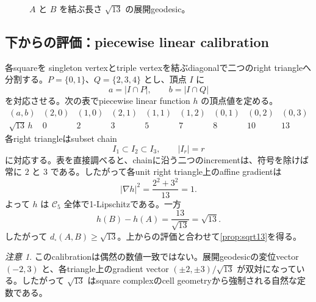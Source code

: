 \documentclass[11pt,a4paper]{ltjsarticle}
\theoremstyle{definition}
\theoremstyle{remark}
\newtheorem{remark}[theorem]{注意}
\newcommand{\cC}{\mathcal C}
\begin{document}
\begin{figure}[ht]
\centering
{}
\caption{$A$ と $B$ を結ぶ長さ $\sqrt{13}$ の展開geodesic。}
\label{fig:sqrt13path}
\end{figure}

\subsection{下からの評価：piecewise linear calibration}

各squareを singleton vertexとtriple vertexを結ぶdiagonalで二つのright triangleへ分割する。$P=\{0,1\}$、$Q=\{2,3,4\}$ とし、頂点 $I$ に
\[
 a=|I\cap P|,
 \qquad b=|I\cap Q|
\]
を対応させる。次の表でpiecewise linear function $h$ の頂点値を定める。
\begin{equation}\label{eq:htable}
\begin{array}{c|cccccccc}
(a,b)&(2,0)&(1,0)&(2,1)&(1,1)&(1,2)&(0,1)&(0,2)&(0,3)\\
\hline
\sqrt{13}\,h&0&2&3&5&7&8&10&13
\end{array}
\end{equation}
各right triangleはsubset chain
\[
 I_1\subset I_2\subset I_3,
 \qquad |I_r|=r
\]
に対応する。表を直接調べると、chainに沿う二つのincrementは、符号を除けば常に $2$ と $3$ である。したがって各unit right triangle上のaffine gradientは
\[
 |\nabla h|^2=\frac{2^2+3^2}{13}=1.
\]
よって $h$ は $\cC_5$ 全体で1-Lipschitzである。一方
\[
 h(B)-h(A)=\frac{13}{\sqrt{13}}=\sqrt{13}.
\]
したがって
$d_{\square}(A,B)\geq\sqrt{13}$。上からの評価と合わせて\cref{prop:sqrt13}を得る。

\begin{remark}
このcalibrationは偶然の数値一致ではない。展開geodesicの変位vector $(-2,3)$ と、各triangle上のgradient vector $(\pm2,\pm3)/\sqrt{13}$ が双対になっている。したがって $\sqrt{13}$ はsquare complexのcell geometryから強制される自然な定数である。
\end{remark}
\end{document}
